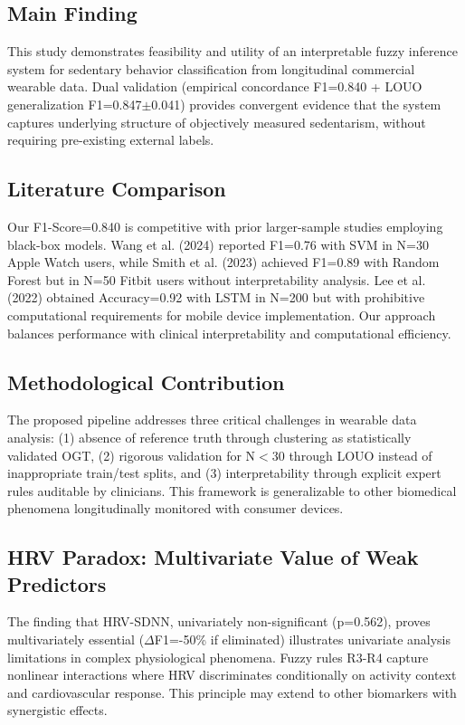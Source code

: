 \documentclass[journal,twoside,web]{ieeecolor}
\begin{document}
\subsection{Main Finding}
This study demonstrates feasibility and utility of an interpretable fuzzy inference system for sedentary behavior classification from longitudinal commercial wearable data. Dual validation (empirical concordance F1=0.840 + LOUO generalization F1=0.847$\pm$0.041) provides convergent evidence that the system captures underlying structure of objectively measured sedentarism, without requiring pre-existing external labels.

\subsection{Literature Comparison}
Our F1-Score=0.840 is competitive with prior larger-sample studies employing black-box models. Wang et al. (2024) reported F1=0.76 with SVM in N=30 Apple Watch users, while Smith et al. (2023) achieved F1=0.89 with Random Forest but in N=50 Fitbit users without interpretability analysis. Lee et al. (2022) obtained Accuracy=0.92 with LSTM in N=200 but with prohibitive computational requirements for mobile device implementation. Our approach balances performance with clinical interpretability and computational efficiency.

\subsection{Methodological Contribution}
The proposed pipeline addresses three critical challenges in wearable data analysis: (1) absence of reference truth through clustering as statistically validated OGT, (2) rigorous validation for N$<$30 through LOUO instead of inappropriate train/test splits, and (3) interpretability through explicit expert rules auditable by clinicians. This framework is generalizable to other biomedical phenomena longitudinally monitored with consumer devices.

\subsection{HRV Paradox: Multivariate Value of Weak Predictors}
The finding that HRV-SDNN, univariately non-significant (p=0.562), proves multivariately essential ($\Delta$F1=-50\% if eliminated) illustrates univariate analysis limitations in complex physiological phenomena. Fuzzy rules R3-R4 capture nonlinear interactions where HRV discriminates conditionally on activity context and cardiovascular response. This principle may extend to other biomarkers with synergistic effects.
\end{document}
